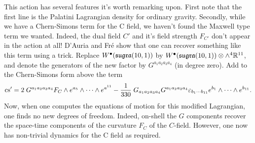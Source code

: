 \documentclass[10pt, oneside]{article}
\begin{document}
This action has several features it's worth remarking upon.  First note that the first line is the Palatini Lagrangian density for ordinary gravity.  Secondly, while we have a Chern-Simons term for the C field, we haven't found the Maxwell type term we wanted.  Indeed, the dual field $C'$ and it's field strength $F_{C'}$ don't appear in the action at all!  D'Auria and Fr\'e show that one can recover something like this term using a trick.  Replace $W^\bullet(\mathfrak{sugra}(10,1))$ by $W^\bullet(\mathfrak{sugra}(10,1)) \otimes \wedge^4 \mathbb{R}^{11}$, and denote the generators of the new factor by $G^{a_1 a_2 a_3 a_4}$ (in degree zero). Add to the Chern-Simons form above the term
\[\mathrm{cs}' = 2\; G^{a_1 a_2 a_3 a_4} F_C \wedge e^{a_5} \wedge \cdots \wedge e^{a^{11}} - \frac 1{330} \; G_{a_1 a_2 a_3 a_4}G^{a_1 a_2 a_3 a_4} \varepsilon_{b_1 \cdots b_{11}} e^{b_1} \wedge \cdots \wedge e^{b_{11}}.\]
Now, when one computes the equations of motion for this modified Lagrangian, one finds no new degrees of freedom.  Indeed, on-shell the $G$ components recover the space-time components of the curvature $F_C$ of the $C$-field.  However, one now has non-trivial dynamics for the C field as required.
\end{document}
